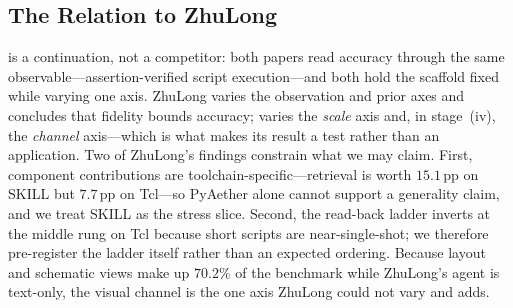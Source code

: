 \subsection{The Relation to ZhuLong}\label{sec:relation}
\llm is a continuation, not a competitor: both papers read accuracy through the same observable---assertion-verified script execution---and both hold the scaffold fixed while varying one axis.
ZhuLong varies the observation and prior axes and concludes that fidelity bounds accuracy; \llm varies the \emph{scale} axis and, in stage~(iv), the \emph{channel} axis---which is what makes its result a test rather than an application.
Two of ZhuLong's findings constrain what we may claim.
First, component contributions are toolchain-specific---retrieval is worth $15.1$\,pp on SKILL but $7.7$\,pp on Tcl---so PyAether alone cannot support a generality claim, and we treat SKILL as the stress slice.
Second, the read-back ladder inverts at the middle rung on Tcl because short scripts are near-single-shot; we therefore pre-register the ladder itself rather than an expected ordering.
Because layout and schematic views make up $70.2\%$ of the benchmark while ZhuLong's agent is text-only, the visual channel is the one axis ZhuLong could not vary and \llm adds.
